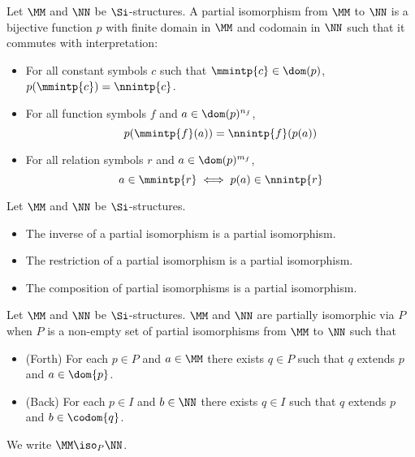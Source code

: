 
\begin{dfn}
    Let $\MM$ and $\NN$ be $\Si$-structures.
    A partial isomorphism from $\MM$ to $\NN$ is a bijective function $p$
    with finite domain in $\MM$ and codomain in $\NN$ such that it commutes with 
    interpretation:
    \begin{itemize}
        \item For all constant symbols $c$ such that $\mmintp{c} \in \dom(p)$,
            $p(\mmintp{c}) = \nnintp{c}$.
        \item For all function symbols $f$ and $a \in \dom(p)^{n_f}$, 
            \[p(\mmintp{f}(a)) =
             \nnintp{f}(p(a))\]
        \item For all relation symbols $r$ and $a \in \dom(p)^{m_f}$,
            \[a \in \mmintp{r} \iff p(a) \in \nnintp{r}\]
    \end{itemize}
\end{dfn}

\begin{prop}
    Let $\MM$ and $\NN$ be $\Si$-structures.
    \begin{itemize}
        \item The inverse of a partial isomorphism is a partial isomorphism.
        \item The restriction of a partial isomorphism is a partial isomorphism.
        \item The composition of partial isomorphisms is a partial isomorphism.
    \end{itemize}
\end{prop}

\begin{dfn}
    Let $\MM$ and $\NN$ be $\Si$-structures.
    $\MM$ and $\NN$ are partially isomorphic via $P$
    when $P$ is a non-empty set
    of partial isomorphisms from $\MM$ to $\NN$ such that 
    \begin{itemize}
        \item (Forth) For each $p \in P$ and $a \in \MM$
            there exists $q \in P$ such that 
            $q$ extends $p$ and $a \in \dom{p}$.
        \item (Back) For each $p \in I$ and $b \in \NN$
            there exists $q \in I$ such that 
            $q$ extends $p$ and $b \in \codom{q}$.
    \end{itemize}
    We write $\MM \iso_P \NN$.
\end{dfn}

